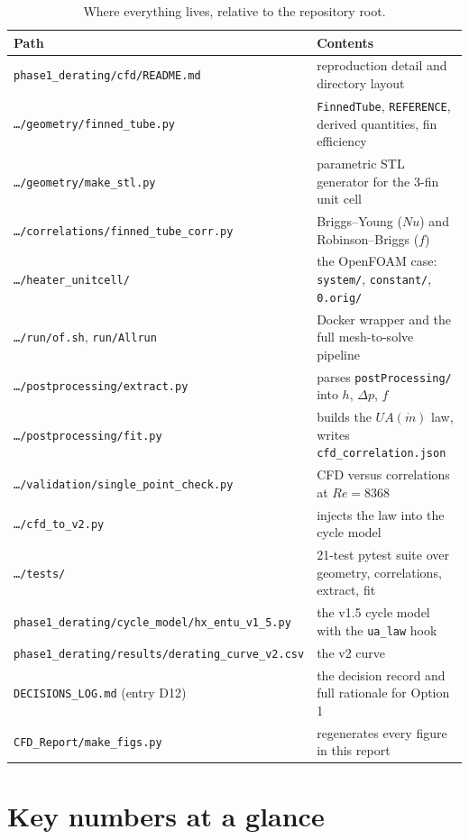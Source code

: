\documentclass[11pt]{article}
\newcommand{\mdot}{\dot m}
\newcommand{\file}[1]{\texttt{\small #1}}
\begin{document}
\begin{table}[h]\centering\small
\caption{Where everything lives, relative to the repository root.}\label{tab:files}
\setlength{\tabcolsep}{4pt}
\begin{tabular}{@{}lp{8.1cm}@{}}
\toprule
Path & Contents\\
\midrule
\file{phase1\_derating/cfd/README.md} & reproduction detail and directory layout\\
\file{\ldots/geometry/finned\_tube.py} & \file{FinnedTube}, \file{REFERENCE}, derived quantities, fin efficiency\\
\file{\ldots/geometry/make\_stl.py} & parametric STL generator for the 3-fin unit cell\\
\file{\ldots/correlations/finned\_tube\_corr.py} & Briggs--Young ($Nu$) and Robinson--Briggs ($f$)\\
\file{\ldots/heater\_unitcell/} & the OpenFOAM case: \file{system/}, \file{constant/}, \file{0.orig/}\\
\file{\ldots/run/of.sh}, \file{run/Allrun} & Docker wrapper and the full mesh-to-solve pipeline\\
\file{\ldots/postprocessing/extract.py} & parses \file{postProcessing/} into $h$, $\Delta p$, $f$\\
\file{\ldots/postprocessing/fit.py} & builds the $UA(\mdot)$ law, writes \file{cfd\_correlation.json}\\
\file{\ldots/validation/single\_point\_check.py} & CFD versus correlations at $Re = 8368$\\
\file{\ldots/cfd\_to\_v2.py} & injects the law into the cycle model\\
\file{\ldots/tests/} & 21-test pytest suite over geometry, correlations, extract, fit\\
\file{phase1\_derating/cycle\_model/hx\_entu\_v1\_5.py} & the v1.5 cycle model with the \file{ua\_law} hook\\
\file{phase1\_derating/results/derating\_curve\_v2.csv} & the v2 curve\\
\file{DECISIONS\_LOG.md} (entry D12) & the decision record and full rationale for Option 1\\
\file{CFD\_Report/make\_figs.py} & regenerates every figure in this report\\
\bottomrule
\end{tabular}
\end{table}

\section{Key numbers at a glance}
\end{document}
